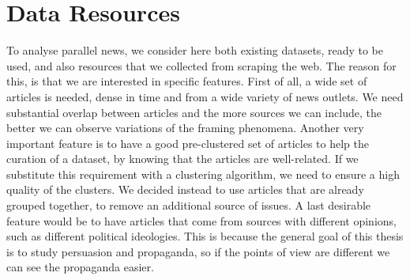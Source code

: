 \section{\statusgreen Data Resources}
\label{sec:cgs_data}
To analyse parallel news, we consider here both existing datasets, ready to be used, and also resources that we collected from scraping the web.
The reason for this, is that we are interested in specific features.
First of all, a wide set of articles is needed, dense in time and from a wide variety of news outlets. We need substantial overlap between articles and the more sources we can include, the better we can observe variations of the framing phenomena.
Another very important feature is to have a good pre-clustered set of articles to help the curation of a dataset, %
by knowing that the articles are well-related.
If we substitute this requirement with a clustering algorithm, we need to ensure a high quality of the clusters. We decided instead to use articles that are already grouped together, to remove an additional source of issues.
A last desirable feature would be to have articles that come from sources with different opinions, such as different political ideologies. %
This is because the general goal of this thesis is to study persuasion and propaganda, so if the points of view are different we can see the propaganda easier.

